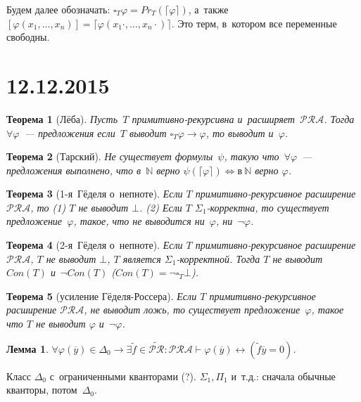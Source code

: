 \documentclass{article}
\newtheorem{theorem}{Теорема}
\newtheorem{lemma}{Лемма}
\theoremstyle{remark}
\renewcommand{\phi}{\varphi}
\begin{document}
Будем далее обозначать: $\square_T \phi = Pr_T(\lceil \phi \rceil)$, а~также
$[\phi(x_1, \ldots, x_n)] = \lceil \phi(x_1\cdot, \ldots, x_n\cdot) \rceil$.
Это терм, в~котором все переменные свободны.

\section*{12.12.2015}

\begin{theorem}[Лёба]
  Пусть~$T$ примитивно-рекурсивна и~расширяет~$\mathcal{PRA}$. Тогда~$\forall
  \phi$~--- предложения если~$T$ выводит $\square_T \phi \rightarrow \phi$, то
  выводит и~$\phi$.
\end{theorem}

\begin{theorem}[Тарский]
  Не существует формулы~$\psi$, такую что~$\forall \phi$~--- предложения
  выполнено, что в~$\mathbb{N}$ верно $\psi(\lceil \phi \rceil)
  \Leftrightarrow в~\mathbb{N}$ верно $\phi$.
\end{theorem}

\begin{theorem}[1-я~Гёделя о~непноте]
  Если $T$ примитивно-рекурсивное расширение $\mathcal{PRA}$, то
  (1) $T$ не выводит $\bot$.
  (2) Если $T$ $\Sigma_1$-корректна, то существует предложение~$\phi$, такое,
  что не выводится ни~$\phi$, ни~$\neg\phi$.
\end{theorem}

\begin{theorem}[2-я~Гёделя о~непноте]
  Если $T$ примитивно-рекурсивное расширение $\mathcal{PRA}$, $T$ не выводит
  $\bot$, $T$ является $\Sigma_1$-корректной. Тогда $T$ не выводит $Con(T)$
  и~$\neg Con(T)$ ($Con(T) = \neg \square_T \bot$).
\end{theorem}

\begin{theorem}[усиление Гёделя-Россера]
  Если $T$ примитивно-рекурсивное расширение $\mathcal{PRA}$, не выводит ложь,
  то существует предложение~$\phi$, такое что $T$ не выводит $\phi$ и~$\neg
  \phi$.
\end{theorem}

\begin{lemma}
  $\forall \phi(\overline{y}) \in \Delta_0 \rightarrow \exists \widetilde{f} \in
  \widetilde{\mathcal{PR}}: \mathcal{PRA} \vdash \phi(\overline{y})
  \leftrightarrow (\widetilde{f}\overline{y}=0)$.
\end{lemma}

Класс $\Delta_0$ с~ограниченными кванторами (?). $\Sigma_1, \Pi_1$ и~т.д.:
сначала обычные кванторы, потом~$\Delta_0$.
\end{document}
